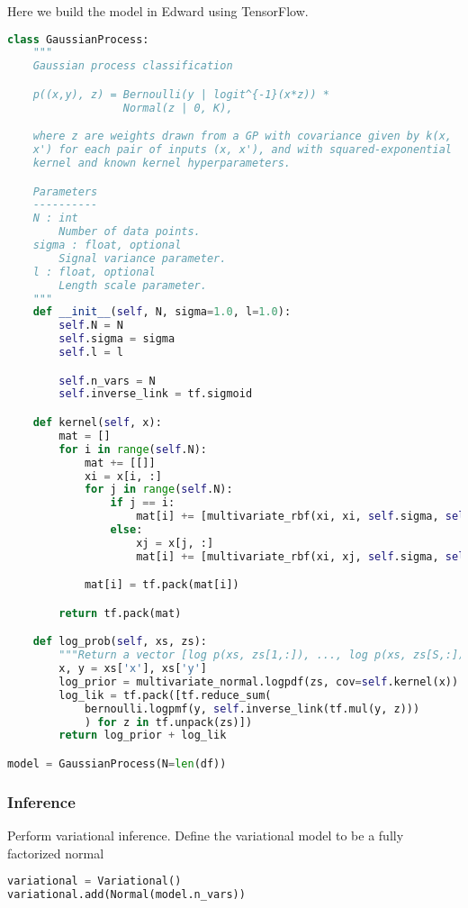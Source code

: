 Here we build the model in Edward using TensorFlow.
\begin{lstlisting}[language=Python]
class GaussianProcess:
    """
    Gaussian process classification

    p((x,y), z) = Bernoulli(y | logit^{-1}(x*z)) *
                  Normal(z | 0, K),

    where z are weights drawn from a GP with covariance given by k(x,
    x') for each pair of inputs (x, x'), and with squared-exponential
    kernel and known kernel hyperparameters.

    Parameters
    ----------
    N : int
        Number of data points.
    sigma : float, optional
        Signal variance parameter.
    l : float, optional
        Length scale parameter.
    """
    def __init__(self, N, sigma=1.0, l=1.0):
        self.N = N
        self.sigma = sigma
        self.l = l

        self.n_vars = N
        self.inverse_link = tf.sigmoid

    def kernel(self, x):
        mat = []
        for i in range(self.N):
            mat += [[]]
            xi = x[i, :]
            for j in range(self.N):
                if j == i:
                    mat[i] += [multivariate_rbf(xi, xi, self.sigma, self.l)]
                else:
                    xj = x[j, :]
                    mat[i] += [multivariate_rbf(xi, xj, self.sigma, self.l)]

            mat[i] = tf.pack(mat[i])

        return tf.pack(mat)

    def log_prob(self, xs, zs):
        """Return a vector [log p(xs, zs[1,:]), ..., log p(xs, zs[S,:])]."""
        x, y = xs['x'], xs['y']
        log_prior = multivariate_normal.logpdf(zs, cov=self.kernel(x))
        log_lik = tf.pack([tf.reduce_sum(
            bernoulli.logpmf(y, self.inverse_link(tf.mul(y, z)))
            ) for z in tf.unpack(zs)])
        return log_prior + log_lik

model = GaussianProcess(N=len(df))
\end{lstlisting}


\subsubsection{Inference}

Perform variational inference.
Define the variational model to be a fully factorized normal
\begin{lstlisting}[language=Python]
variational = Variational()
variational.add(Normal(model.n_vars))
\end{lstlisting}

